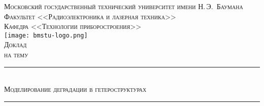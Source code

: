 \newcommand{\HRule}{\rule{\linewidth}{.5mm}\\}

\begin{center}

\textsc{\large Московский государственный технический университет имени Н.\,Э.~Баумана}\\[5mm]
\textsc{Факультет <<Радиоэлектроника и лазерная техника>>}\\
\textsc{Кафедра <<Технологии приборостроения>>}\\[2.5mm]

\texttt{[image: bmstu-logo.png]}\\[0.5cm]

\textsc{\large Доклад}\\
\textsc{на тему}

\HRule[0.5cm]
{\huge \textsc{Моделирование деградации в гетероструктурах}}
\HRule

\vfill



\end{center}

\newpage
{}






